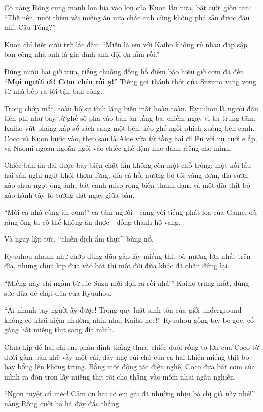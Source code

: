 ﻿\documentclass[../main.tex]{subfiles}
\begin{document}
Cô nàng Rồng cụng mạnh lon bia vào lon của Kuon lần nữa, bật cười giòn tan: ``Thế nên, nuôi thêm vài miệng ăn nữa chắc anh cũng không phá sản được đâu nhỉ, Cậu Tổng?''

Kuon chỉ biết cười trừ lắc đầu: ``Miễn là em với Kaiho không rủ nhau đập sập ban công nhà anh là gia đình anh đội ơn lắm rồi.''

\ct

Đúng mười hai giờ trưa, tiếng chuông đồng hồ điểm báo hiệu giờ cơm đã đến. ``\textbf{Mọi người ơi! Cơm chín rồi ạ!}'' Tiếng gọi thánh thót của Suzuno vang vọng từ nhà bếp ra tới tận ban công.

Trong chớp mắt, toàn bộ sự tĩnh lặng biến mất hoàn toàn. Ryuuhou là người đầu tiên phi như bay từ ghế sô-pha vào bàn ăn tầng ba, chiếm ngay vị trí trung tâm. Kaiho vứt phăng xấp sổ sách sang một bên, kéo ghế ngồi phịch xuống bên cạnh. Coco và Kuon bước vào, theo sau là Aloe vừa từ tầng hai đi lên với nụ cười e ấp, và Naomi ngoan ngoãn ngồi vào chiếc ghế đệm nhỏ dành riêng cho mình.

Chiếc bàn ăn dài được bày biện chật kín không còn một chỗ trống: một nồi lẩu hải sản nghi ngút khói thơm lừng, đĩa cá hồi nướng bơ tỏi vàng ươm, đĩa sườn xào chua ngọt óng ánh, bát canh miso rong biển thanh đạm và một đĩa thịt bò xào hành tây to tướng đặt ngay giữa bàn.

``Mời cả nhà cùng ăn cơm!'' cả tám người - cùng với tiếng phát loa của Game, dù rằng ông ta có thể không ăn được - đồng thanh hô vang.

Và ngay lập tức, ``chiến dịch ẩm thực'' bùng nổ.

Ryuuhou nhanh như chớp dùng đũa gắp lấy miếng thịt bò nướng lớn nhất trên đĩa, nhưng chưa kịp đưa vào bát thì một đôi đũa khác đã chặn đứng lại.

``Miếng này chị ngắm từ lúc Suzu mới dọn ra rồi nhá!'' Kaiho trừng mắt, dùng sức đũa đè chặt đũa của Ryuuhou.

``Ai nhanh tay người ấy được! Trong quy luật sinh tồn của giới underground không có khái niệm nhường nhịn nha, Kaiho-nee!'' Ryuuhou gồng tay bẻ góc, cố gắng hất miếng thịt sang đĩa mình.

Chưa kịp để hai chị em phân định thắng thua, chiếc đuôi rồng to lớn của Coco từ dưới gầm bàn khẽ vẫy một cái, đẩy nhẹ cùi chỏ của cả hai khiến miếng thịt bò bay bổng lên không trung. Bằng một động tác điệu nghệ, Coco đưa bát cơm của mình ra đón trọn lấy miếng thịt rồi cho thẳng vào mồm nhai ngấu nghiến.

``Ngon tuyệt cú mèo! Cảm ơn hai cô em gái đã nhường nhịn bà chị già này nhé!'' nàng Rồng cười ha hả đầy đắc thắng.
\end{document}
